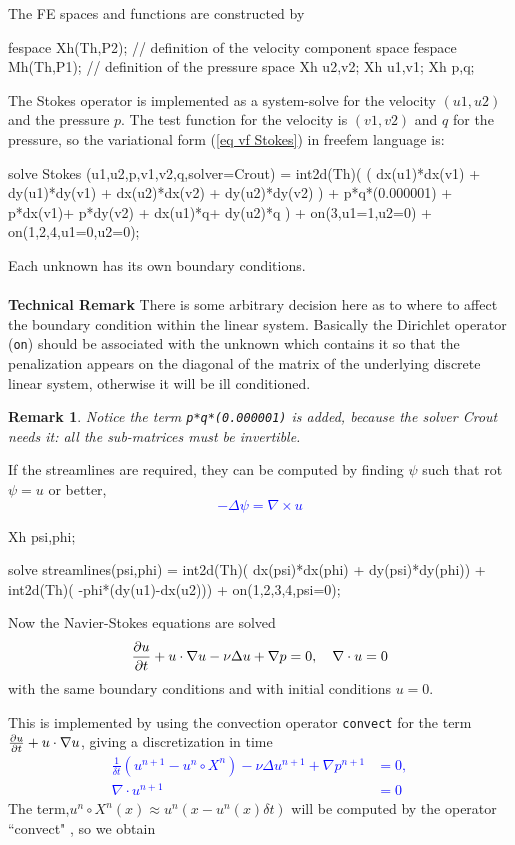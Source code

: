 \documentclass[twoside]{book}
\def\Blue#1{\textcolor{blue}{#1}}
\def\eq#1{\Blue{\[#1\]}}
\newtheorem{remark}{\textbf{Remark}}
\begin{document}
The FE spaces and functions  are constructed by

\bFF

fespace Xh(Th,P2); //  definition of the velocity component space
fespace Mh(Th,P1);  //  definition of the pressure space
Xh u2,v2;
Xh u1,v1;
Xh p,q;
\eFF


The Stokes operator is implemented as a system-solve for the velocity
$(u1,u2)$ and the pressure $p$.  The test function  for the velocity is $(v1,v2)$
and $q$ for the pressure, so the variational form (\ref{eq vf Stokes}) in freefem
language is:
\bFF

solve Stokes (u1,u2,p,v1,v2,q,solver=Crout) =
    int2d(Th)( ( dx(u1)*dx(v1) + dy(u1)*dy(v1)
            +  dx(u2)*dx(v2) + dy(u2)*dy(v2) )
            + p*q*(0.000001)
            + p*dx(v1)+ p*dy(v2)
            + dx(u1)*q+ dy(u2)*q
           )
  + on(3,u1=1,u2=0)
  + on(1,2,4,u1=0,u2=0);
\eFF

Each unknown has its own boundary conditions.
\\\\
{\bf Technical Remark}
There is some arbitrary decision here as to where to affect the
boundary condition within the linear system. Basically the Dirichlet
operator 
(\texttt{on})  should be
associated with the unknown  which contains it so that
the penalization appears on the diagonal
of the matrix of the underlying discrete linear system,
otherwise it will be ill conditioned.

\begin{remark}
Notice the term \texttt{p*q*(0.000001)}  is added, because the  solver
Crout needs it: all the sub-matrices must be invertible.
\end{remark}

If the streamlines are required, they can be
computed by finding $\psi$ such that rot$\psi=u$ or better,
\Blue{$$-\Delta\psi=\nabla\times u$$}
\bFF

Xh psi,phi;

solve streamlines(psi,phi) =
      int2d(Th)( dx(psi)*dx(phi) + dy(psi)*dy(phi))
   +  int2d(Th)( -phi*(dy(u1)-dx(u2)))
   +  on(1,2,3,4,psi=0);
\eFF

\bigskip

Now the Navier-Stokes equations are solved
\eq{
    {\partial {u}\over\partial t} +u\cdot\nabla u-\nu \Delta u+\nabla p=0,~~~ \nabla\cdot u=0
}
with the same boundary conditions and with initial conditions $u=0$.

This is implemented by using the convection operator \texttt{convect} for the term
${\partial u\over\partial t} +u\cdot\nabla u$, giving a discretization in time
\Blue{
\begin{equation}
    \label{eq Navier Stokes carac}
\begin{array}{cl}
\frac{1}{\delta t} (u^{n+1}-u^n\circ X^n) -\nu\Delta u^{n+1} + \nabla p^{n+1} &=0,\\
 \nabla\cdot u^{n+1} &= 0
 \end{array}
\end{equation}
}
The term,$u^n\circ X^n(x)\approx u^n(x-u^n(x)\delta t)$ will be
computed by the operator ``convect"  , so we obtain
\bFF
\end{document}
